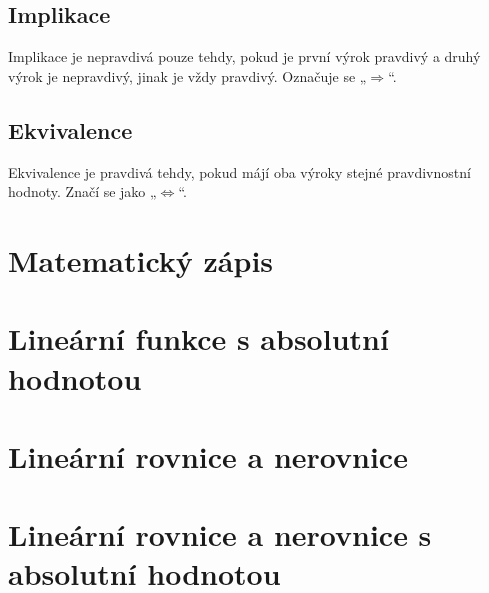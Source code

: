         \subsection{Implikace}
Implikace je nepravdivá pouze tehdy, pokud je první výrok pravdivý a druhý výrok je nepravdivý, jinak je vždy pravdivý. Označuje se „\(\Rightarrow\)“.
        \subsection{Ekvivalence}
Ekvivalence je pravdivá tehdy, pokud májí oba výroky stejné pravdivnostní hodnoty. Značí se jako „\(\Leftrightarrow\)“.
    \section{Matematický zápis}
    \section{Lineární funkce s absolutní hodnotou}
    \section{Lineární rovnice a nerovnice}
    \section{Lineární rovnice a nerovnice s absolutní hodnotou}


